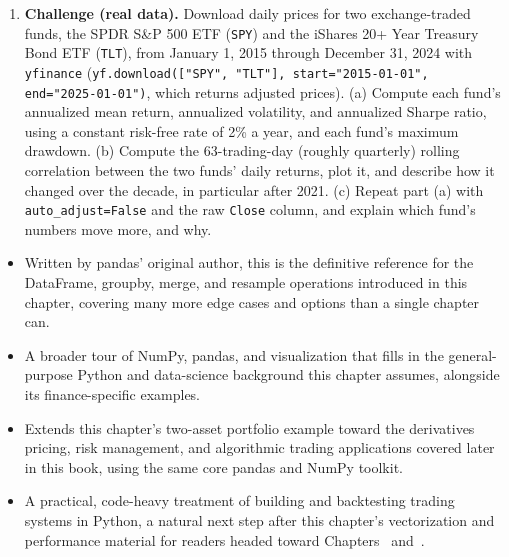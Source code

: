 \documentclass[../ai_in_finance]{subfiles}
\begin{document}
\begin{enumerate}[exercises]
    \item \textbf{Challenge (real data).} Download daily prices for two exchange-traded funds, the SPDR S\&P 500 ETF (\texttt{SPY}) and the iShares 20+ Year Treasury Bond ETF (\texttt{TLT}), from January 1, 2015 through December 31, 2024 with \texttt{yfinance} (\texttt{yf.download(["SPY", "TLT"], start="2015-01-01", end="2025-01-01")}, which returns adjusted prices). (a) Compute each fund's annualized mean return, annualized volatility, and annualized Sharpe ratio, using a constant risk-free rate of 2\% a year, and each fund's maximum drawdown. (b) Compute the 63-trading-day (roughly quarterly) rolling correlation between the two funds' daily returns, plot it, and describe how it changed over the decade, in particular after 2021. (c) Repeat part (a) with \texttt{auto\_adjust=False} and the raw \texttt{Close} column, and explain which fund's numbers move more, and why.
\end{enumerate}


\begin{itemize}
    \item {} Written by pandas' original author, this is the definitive reference for the DataFrame, groupby, merge, and resample operations introduced in this chapter, covering many more edge cases and options than a single chapter can.
    \item {} A broader tour of NumPy, pandas, and visualization that fills in the general-purpose Python and data-science background this chapter assumes, alongside its finance-specific examples.
    \item {} Extends this chapter's two-asset portfolio example toward the derivatives pricing, risk management, and algorithmic trading applications covered later in this book, using the same core pandas and NumPy toolkit.
    \item {} A practical, code-heavy treatment of building and backtesting trading systems in Python, a natural next step after this chapter's vectorization and performance material for readers headed toward Chapters~ and~.
\end{itemize}
\end{document}
